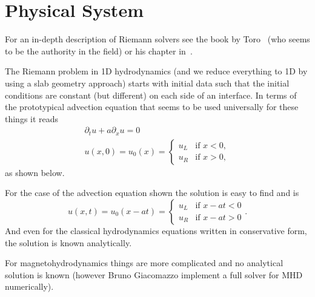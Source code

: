 \section{Physical System}
For an in-depth description of Riemann solvers see the book by
Toro~\cite{toro} (who seems to be the authority in the field) or his chapter
in~\cite{jets_and_stars}.

The Riemann problem in 1D hydrodynamics (and we reduce everything to 1D by
using a slab geometry approach) starts with initial data such that the initial
conditions are constant (but different) on each side of an interface. In terms
of the prototypical advection equation that seems to be used universally for
these things it reads
\begin{gather}
    \partial_t u + a \partial_x u = 0 \\
    u(x,0) = u_0(x) = 
      \begin{cases}
          u_L & \mbox{if $x < 0$}, \\
          u_R & \mbox{if $x > 0$},
      \end{cases}
\end{gather}
as shown below.
\begin{center}

\end{center}

For the case of the advection equation shown the solution is easy to find and
is
\begin{equation}
    u(x,t) = u_0(x-a t) = \begin{cases} 
                          u_L & \mbox{if $x - at < 0$} \\
                          u_R & \mbox{if  $x -at > 0$}
                          \end{cases}.
\end{equation}
And even for the classical hydrodynamics equations written in conservative
form, the solution is known analytically. 

For magnetohydrodynamics things are more complicated and no analytical
solution is known (however Bruno Giacomazzo implement a full solver for MHD
numerically).

